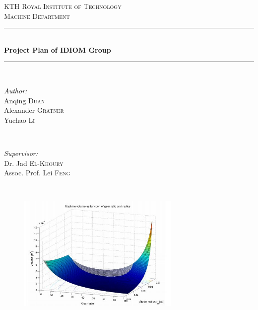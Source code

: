 \documentclass[12pt]{article} %
\begin{document}

\begin{titlepage}

\newcommand{\HRule}{\rule{\linewidth}{0.5mm}} %

\center %

\textsc{\LARGE KTH Royal Institute of Technology}\\[1.5cm] %
\textsc{\Large Machine Department}\\[0.5cm] %


\HRule \\[0.4cm]
{ \huge \bfseries Project Plan of IDIOM Group}\\[0.4cm] %
\HRule \\[1.5cm]

\begin{minipage}{0.4\textwidth}
\begin{flushleft} \large
\emph{Author:}\\
Anqing \textsc{Duan}\\
Alexander \textsc{Gratner}\\
Yuchao \textsc{Li}
\end{flushleft}
\end{minipage}
~
\begin{minipage}{0.4\textwidth}
\begin{flushright} \large
\emph{Supervisor:} \\
Dr. Jad \textsc{El-Khoury}\\
Assoc. Prof. Lei \textsc{Feng} %
\end{flushright}
\end{minipage}\\[1cm]

\begin{figure}[!h]
  \centering
    \includegraphics[width=0.7\textwidth]{Pictures/cover.jpg}


\end{figure}
\end{titlepage}
\end{document}

